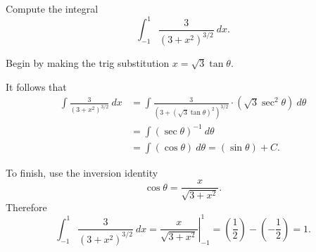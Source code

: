 \documentclass{ximera}
\begin{document}
\begin{question}%

Compute the integral 
\[\int_{-1}^{1}\frac{3}{(3+x^2)^{3/2}}~dx.\]
\begin{multiplechoice}
\end{multiplechoice}
\begin{feedback}
Begin by making the trig substitution \(x=\sqrt{3}\tan \theta\). \begin{hint} It follows that 
\[ \begin{aligned} \int\frac{3}{(3+x^2)^{3/2}}~dx & = \int \frac{3}{(3+(\sqrt{3}\tan \theta)^2)^{3/2}} \cdot (\sqrt{3}\sec^2 \theta)~d \theta \\
 & = \int (\sec \theta)^{-1}~d \theta \\ & = \int (\cos \theta) ~ d \theta = (\sin \theta) + C. \end{aligned} \] \begin{hint}
To finish, use the inversion identity \[\cos \theta = \frac{x}{\sqrt{3+x^2}}.\]
Therefore \[\int_{-1}^{1}\frac{3}{(3+x^2)^{3/2}}~dx = \left.\frac{x}{\sqrt{3+x^2}}\right|_{-1}^{1} = \left(\frac{1}{2}\right) - \left(-\frac{1}{2}\right) = 1.\] \end{hint} \end{hint}
\end{feedback}

\end{question}
\end{document}
